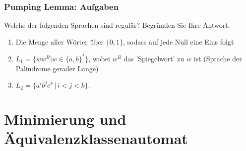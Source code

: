 \begin{frame}
\frametitle{Pumping Lemma: Aufgaben}
Welche der folgenden Sprachen sind regulär? Begründen Sie Ihre Antwort.

\begin{enumerate}
\item Die Menge aller Wörter über $\{0, 1\}$, sodass auf jede Null eine Eins folgt
\item $L_1 = \{ww^R | w \in \{a,b\}^*\}$, wobei $w^R$ das 'Spiegelwort' zu $w$ ist (Sprache der Palindrome gerader Länge)
\item $L_2 = \{a^ib^jc^k \, | \, i < j < k\}$.
\end{enumerate}

\end{frame}

\section{Minimierung und Äquivalenzklassenautomat}
